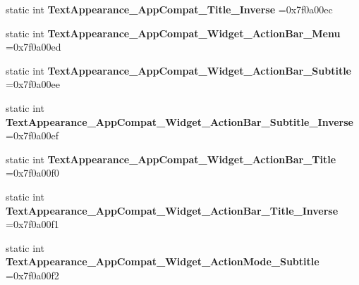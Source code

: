 \begin{DoxyCompactItemize}
\item 
\mbox{\label{classandroid_1_1support_1_1v7_1_1recyclerview_1_1R_1_1style_a676cbf64c10dfd1266b6b1e0a3b82383}} 
static int {\bfseries Text\+Appearance\+\_\+\+App\+Compat\+\_\+\+Title\+\_\+\+Inverse} =0x7f0a00ec
\item 
\mbox{\label{classandroid_1_1support_1_1v7_1_1recyclerview_1_1R_1_1style_ad27348eb18a0adaa62fee27b1e01cff4}} 
static int {\bfseries Text\+Appearance\+\_\+\+App\+Compat\+\_\+\+Widget\+\_\+\+Action\+Bar\+\_\+\+Menu} =0x7f0a00ed
\item 
\mbox{\label{classandroid_1_1support_1_1v7_1_1recyclerview_1_1R_1_1style_aaec01393407906937ce401358dbcbfbd}} 
static int {\bfseries Text\+Appearance\+\_\+\+App\+Compat\+\_\+\+Widget\+\_\+\+Action\+Bar\+\_\+\+Subtitle} =0x7f0a00ee
\item 
\mbox{\label{classandroid_1_1support_1_1v7_1_1recyclerview_1_1R_1_1style_a575a3347b18b7a5f953a84a8d26759e8}} 
static int {\bfseries Text\+Appearance\+\_\+\+App\+Compat\+\_\+\+Widget\+\_\+\+Action\+Bar\+\_\+\+Subtitle\+\_\+\+Inverse} =0x7f0a00ef
\item 
\mbox{\label{classandroid_1_1support_1_1v7_1_1recyclerview_1_1R_1_1style_ad4e58afd4908a3634350729bffee14f4}} 
static int {\bfseries Text\+Appearance\+\_\+\+App\+Compat\+\_\+\+Widget\+\_\+\+Action\+Bar\+\_\+\+Title} =0x7f0a00f0
\item 
\mbox{\label{classandroid_1_1support_1_1v7_1_1recyclerview_1_1R_1_1style_a0b08ae7b666b905b3d8d584f67f2b07f}} 
static int {\bfseries Text\+Appearance\+\_\+\+App\+Compat\+\_\+\+Widget\+\_\+\+Action\+Bar\+\_\+\+Title\+\_\+\+Inverse} =0x7f0a00f1
\item 
\mbox{\label{classandroid_1_1support_1_1v7_1_1recyclerview_1_1R_1_1style_a9c3ac6952966534c4c1be6ac08bcdcd2}} 
static int {\bfseries Text\+Appearance\+\_\+\+App\+Compat\+\_\+\+Widget\+\_\+\+Action\+Mode\+\_\+\+Subtitle} =0x7f0a00f2

\end{DoxyCompactItemize}
